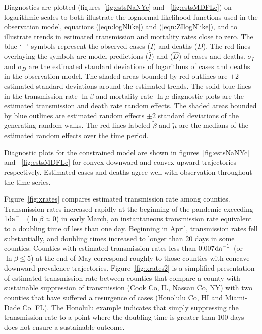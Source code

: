 \documentclass[12pt,letterpaper]{article}
\newcommand\perda{$\rm{da}^{-1}$}
\begin{document}
Diagnostics are plotted
(figures~\ref{fig:estsNaNYc} and~ \ref{fig:estsMDFLc})
on logarithmic scales to both illustrate the
lognormal likelihood functions used in the observation model,
equations (\ref{eqn:logNlike}) and (\ref{eqn:ZIlogNlike}), and to
illustrate trends in estimated transmission and mortality rates close
to zero.
\label{pp:diagexpl} 
The blue `+' symbols represent the observed cases ($I$) and deaths ($D$).
The red lines overlaying the symbols are model predictions ($\widehat{I}$)
and ($\widehat{D}$) of cases and deaths. 
$\sigma_I$ and $\sigma_D$ are the estimated standard deviations of
logarithms of cases and deaths in the observation model.
The shaded areas bounded by red outlines are 
$\pm 2$ estimated standard deviations around the estimated trends.
The solid blue lines in the transmission rate $\ln \beta$ and
mortality rate $\ln \mu$ diagnostic plots are the estimated
transmission and death rate random effects.
The shaded areas bounded by blue outlines are
estimated random effects $\pm 2$ standard deviations of the generating
random walks.
The red lines labeled $\tilde{\beta}$ and $\tilde{\mu}$ are the
medians of the estimated random effects over the time period.

Diagnostic plots for the constrained model are shown in
figures~\ref{fig:estsNaNYc} and~ \ref{fig:estsMDFLc}
for convex downward and convex upward trajectories
respectively.
Estimated cases and deaths agree well with observation throughout the
time series.

Figure~\ref{fig:xrates} compares estimated transmission rate among
counties.
Transmission rates increased rapidly at the beginning of the pandemic
exceeding  1\perda\ ($\ln \beta \approx 0$) in early March, 
an instantaneous transmission rate
equivalent to a doubling time of less than one day.
Beginning in April, transmission rates fell substantially, and doubling times
increased to longer than 20 days in some counties.
Counties with estimated transmission rates less than 0.007\perda\ 
(or $\ln \beta \le 5$) at the end of May
correspond roughly to those counties with concave downward prevalence
trajectories.
Figure~\ref{fig:xrates2} is a simplified presentation of estimated
transmission rate between counties that compare a county with sustainable
suppression of transmission (Cook Co, IL, Nassau Co, NY) with two counties that
have suffered a resurgence of cases (Honolulu Co, HI and Miami-Dade Co.
FL). The Honolulu example indicates that simply suppressing the
transmission rate to a point where the doubling time is greater than
100 days does not ensure a sustainable outcome.
\end{document}

